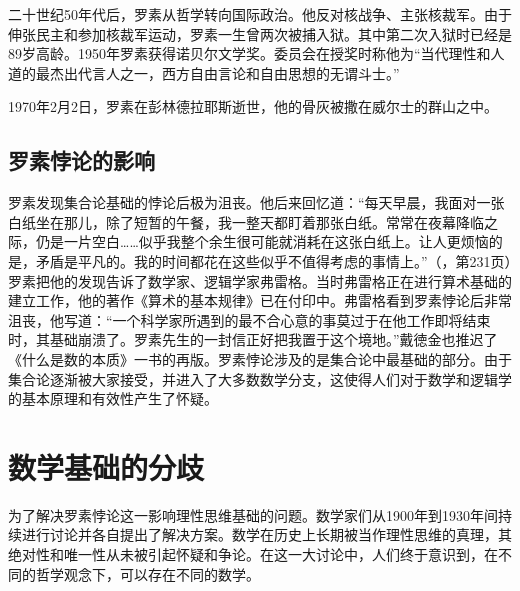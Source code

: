 \documentclass{article}
\begin{document}
二十世纪50年代后，罗素从哲学转向国际政治。他反对核战争、主张核裁军。由于伸张民主和参加核裁军运动，罗素一生曾两次被捕入狱。其中第二次入狱时已经是89岁高龄。1950年罗素获得诺贝尔文学奖。委员会在授奖时称他为“当代理性和人道的最杰出代言人之一，西方自由言论和自由思想的无谓斗士。”

1970年2月2日，罗素在彭林德拉耶斯逝世，他的骨灰被撒在威尔士的群山之中。

\subsection{罗素悖论的影响}

罗素发现集合论基础的悖论后极为沮丧。他后来回忆道：“每天早晨，我面对一张白纸坐在那儿，除了短暂的午餐，我一整天都盯着那张白纸。常常在夜幕降临之际，仍是一片空白……似乎我整个余生很可能就消耗在这张白纸上。让人更烦恼的是，矛盾是平凡的。我的时间都花在这些似乎不值得考虑的事情上。”（\cite{HanXueTao16}，第231页）罗素把他的发现告诉了数学家、逻辑学家弗雷格。当时弗雷格正在进行算术基础的建立工作，他的著作《算术的基本规律》已在付印中。弗雷格看到罗素悖论后非常沮丧，他写道：“一个科学家所遇到的最不合心意的事莫过于在他工作即将结束时，其基础崩溃了。罗素先生的一封信正好把我置于这个境地。”戴徳金也推迟了《什么是数的本质》一书的再版。罗素悖论涉及的是集合论中最基础的部分。由于集合论逐渐被大家接受，并进入了大多数数学分支，这使得人们对于数学和逻辑学的基本原理和有效性产生了怀疑。

\begin{Exercise}
\end{Exercise}

\section{数学基础的分歧}

为了解决罗素悖论这一影响理性思维基础的问题。数学家们从1900年到1930年间持续进行讨论并各自提出了解决方案。数学在历史上长期被当作理性思维的真理，其绝对性和唯一性从未被引起怀疑和争论。在这一大讨论中，人们终于意识到，在不同的哲学观念下，可以存在不同的数学。
\end{document}
